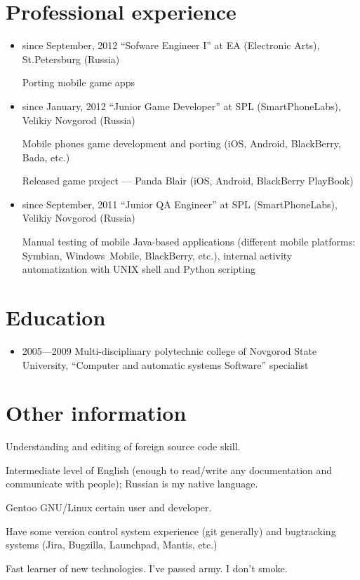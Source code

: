 \section{Professional experience}
\begin{itemize}
\item since September, 2012 ``Sofware Engineer I'' at EA (Electronic Arts),
St.Petersburg (Russia)

Porting mobile game apps

\item since January, 2012 ``Junior Game Developer'' at SPL (SmartPhoneLabs),
Velikiy Novgorod (Russia)

Mobile phones game development and porting
(iOS, Android, BlackBerry, Bada, etc.)

Released game project --- Panda Blair (iOS, Android, BlackBerry PlayBook)

\item since September, 2011 ``Junior QA Engineer'' at SPL (SmartPhoneLabs),
Velikiy Novgorod (Russia)

Manual testing of mobile Java-based applications (different mobile
platforms: Symbian, Windows~Mobile, BlackBerry, etc.),
internal activity automatization with UNIX shell and Python scripting
\end{itemize}

\section{Education}
\begin{itemize}
\item 2005---2009 Multi-disciplinary polytechnic college of
Novgorod State University,
``Computer and automatic systems Software'' specialist
\end{itemize}

\section{Other information}
Understanding and editing of foreign source code skill.

Intermediate level of English
(enough to read/write any documentation and communicate with people);
Russian is my native language.

Gentoo GNU/Linux certain user and developer.

Have some version control system experience (git generally) and
bugtracking systems (Jira, Bugzilla, Launchpad, Mantis, etc.)

Fast learner of new technologies.
I've passed army.
I don't smoke.
